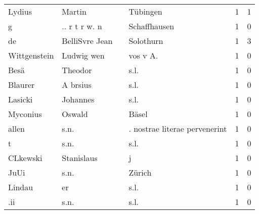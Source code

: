 \begin{center}
\begin{tiny}
\begin{longtabu}{llllrr}
                   Lydius &                             Martin &             &                                    Tübingen &          1 &         1 \\
                        g &                      .. r t r w. n &             &                                Schaffhausen &          1 &         0 \\
                       de &                     BelliSvre Jean &             &                                   Solothurn &          1 &         3 \\
             Wittgenstein &                         Ludwig wen &             &                                   vos v A.  &          1 &         0 \\
                     Besä &                            Theodor &             &                                        s.l. &          1 &         0 \\
                  Blaurer &                           A brsius &             &                                        s.l. &          1 &         0 \\
                  Lasicki &                           Johannes &             &                                        s.l. &          1 &         0 \\
                 Myconius &                             Oswald &             &                                       Bäsel &          1 &         0 \\
                    allen &                               s.n. &             &               . nostrae literae pervenerint &          1 &         0 \\
                        t &                               s.n. &             &                                        s.l. &          1 &         0 \\
                 CLkewski &                         Stanislaus &             &                                           j &          1 &         0 \\
                     JuUi &                               s.n. &             &                                      Zürich &          1 &         0 \\
                   Lindau &                                 er &             &                                        s.l. &          1 &         0 \\
                      .ii &                               s.n. &             &                                        s.l. &          1 &         0 \\

\end{longtabu}
\end{tiny}
\end{center}
